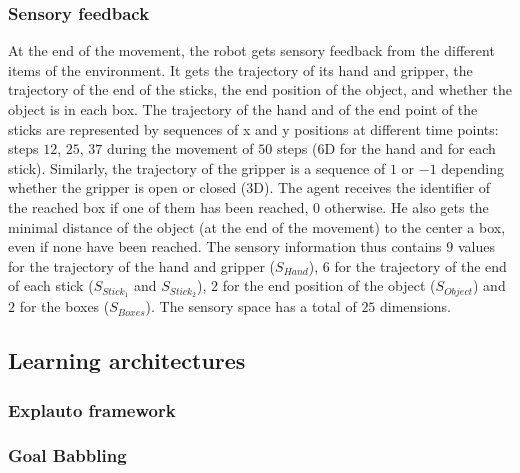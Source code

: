 \documentclass[10pt,letterpaper]{article}
\begin{document}
		
		\subsubsection{Sensory feedback}
		
			At the end of the movement, the robot gets sensory feedback from the different items of the environment.
			It gets the trajectory of its hand and gripper, the trajectory of the end of the sticks, 
			the end position of the object, and whether the object is in each box.		
			The trajectory of the hand and of the end point of the sticks are represented by sequences of x and y positions at different time points: 
			steps $12$, $25$, $37$ during the movement of $50$ steps ($6$D for the hand and for each stick).
			Similarly, the trajectory of the gripper is a sequence of $1$ or $-1$ depending whether the gripper is open or closed ($3$D).
			The agent receives the identifier of the reached box if one of them has been reached, 0 otherwise. He also gets the minimal distance of the object (at the end of the movement) to the center a box, even if none have been reached.
			The sensory information thus contains $9$ values for the trajectory of the hand and gripper ($S_{Hand}$), $6$ for the trajectory of the end of each stick ($S_{Stick_1}$ and $S_{Stick_2}$), $2$ for the end position of the object ($S_{Object}$) and $2$ for the boxes ($S_{Boxes}$).
			The sensory space has a total of $25$ dimensions.
			
		
	
	\subsection{Learning architectures}

		\subsubsection{Explauto framework}
			
			\cite{moulin-frier_explauto:_2014}
			
				
		
		\subsubsection{Goal Babbling}
			
\end{document}
